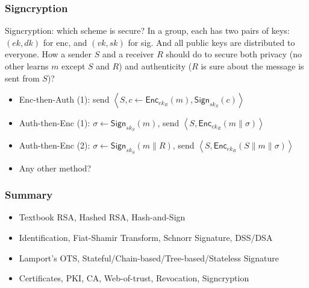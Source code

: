 \begin{frame}\frametitle{Signcryption}
\begin{exampleblock}{Signcryption: which scheme is secure?}
In a group, each has two pairs of keys: $(ek, dk)$ for enc, and $(vk, sk)$ for sig. And all public keys are distributed to everyone. How a sender $S$ and a receiver $R$ should do to secure both privacy (no other learns $m$ except $S$ and $R$) and authenticity ($R$ is sure about the message is sent from $S$)?
\begin{itemize}
\item Enc-then-Auth (1): send $\left< S, c \leftarrow \mathsf{Enc}_{ek_R}(m), \mathsf{Sign}_{sk_S}(c) \right>$
\item Auth-then-Enc (1): $\sigma \leftarrow \mathsf{Sign}_{sk_S}(m)$, send $\left< S, \mathsf{Enc}_{ek_R}(m\| \sigma) \right>$
\item Auth-then-Enc (2): $\sigma \leftarrow \mathsf{Sign}_{sk_S}(m \| R)$, send $\left< S, \mathsf{Enc}_{ek_R}(S\| m \| \sigma) \right>$
\item Any other method?
\end{itemize}
\end{exampleblock}
\end{frame}
\begin{frame}\frametitle{Summary}
\begin{itemize}
\item Textbook RSA, Hashed RSA, Hash-and-Sign
\item Identification, Fiat-Shamir Transform, Schnorr Signature, DSS/DSA
\item Lamport's OTS, Stateful/Chain-based/Tree-based/Stateless Signature
\item Certificates, PKI, CA, Web-of-trust, Revocation, Signcryption
\end{itemize}
\end{frame}

